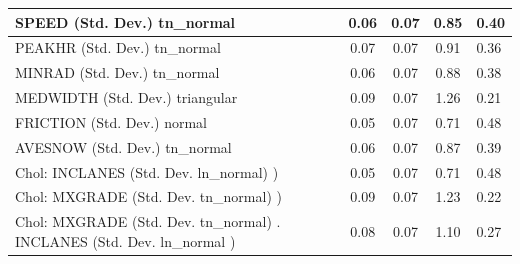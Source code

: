 \begin{table}
\begin{center}
\begin{tabular}{|l|l|c|c|c|l|}
			\hline
			SPEED (Std. Dev.) tn_normal &  & 0.06 & 0.07 & 0.85 & 0.40 \\
			\hline
			PEAKHR (Std. Dev.) tn_normal &  & 0.07 & 0.07 & 0.91 & 0.36 \\
			\hline
			MINRAD (Std. Dev.) tn_normal &  & 0.06 & 0.07 & 0.88 & 0.38 \\
			\hline
			MEDWIDTH (Std. Dev.) triangular &  & 0.09 & 0.07 & 1.26 & 0.21 \\
			\hline
			FRICTION (Std. Dev.) normal &  & 0.05 & 0.07 & 0.71 & 0.48 \\
			\hline
			AVESNOW (Std. Dev.) tn_normal &  & 0.06 & 0.07 & 0.87 & 0.39 \\
			\hline
			 Chol: INCLANES (Std. Dev. ln_normal) ) &  & 0.05 & 0.07 & 0.71 & 0.48 \\
			\hline
			 Chol: MXGRADE (Std. Dev. tn_normal) ) &  & 0.09 & 0.07 & 1.23 & 0.22 \\
			\hline
			 Chol: MXGRADE (Std. Dev. tn_normal) . INCLANES (Std. Dev.   ln_normal ) &  & 0.08 & 0.07 & 1.10 & 0.27 \\
			\hline
		\end{tabular}
	\end{center}
\end{table}